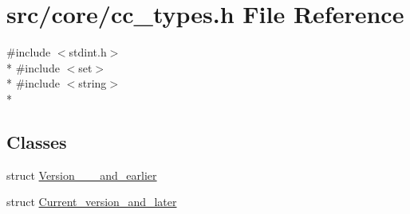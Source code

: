 \hypertarget{a00216}{\section{src/core/cc\-\_\-types.h File Reference}
\label{a00216}
}
{\ttfamily \#include $<$stdint.\-h$>$}\\*
{\ttfamily \#include $<$set$>$}\\*
{\ttfamily \#include $<$string$>$}\\*
\subsection*{Classes}
\begin{DoxyCompactItemize}
\item 
struct \hyperlink{a00153}{Version\-\_\-\_\-\_\-and\-\_\-earlier}
\item 
struct \hyperlink{a00097}{Current\-\_\-version\-\_\-and\-\_\-later}
\end{DoxyCompactItemize}
